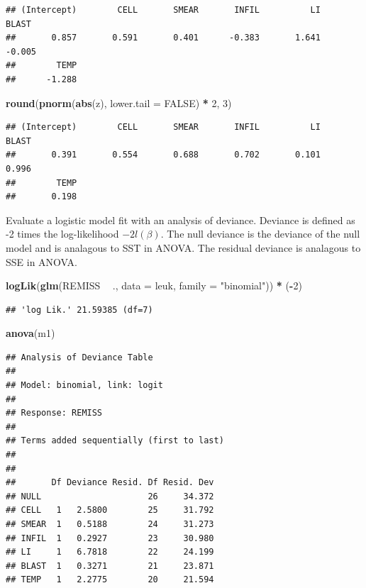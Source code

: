 \documentclass[
]{book}
\newenvironment{Shaded}{\begin{snugshade}}{\end{snugshade}}
\newcommand{\DataTypeTok}[1]{\textcolor[rgb]{0.13,0.29,0.53}{#1}}
\newcommand{\DecValTok}[1]{\textcolor[rgb]{0.00,0.00,0.81}{#1}}
\newcommand{\KeywordTok}[1]{\textcolor[rgb]{0.13,0.29,0.53}{\textbf{#1}}}
\newcommand{\NormalTok}[1]{#1}
\newcommand{\OperatorTok}[1]{\textcolor[rgb]{0.81,0.36,0.00}{\textbf{#1}}}
\newcommand{\OtherTok}[1]{\textcolor[rgb]{0.56,0.35,0.01}{#1}}
\newcommand{\StringTok}[1]{\textcolor[rgb]{0.31,0.60,0.02}{#1}}
\begin{document}
\begin{verbatim}
## (Intercept)        CELL       SMEAR       INFIL          LI       BLAST 
##       0.857       0.591       0.401      -0.383       1.641      -0.005 
##        TEMP 
##      -1.288
\end{verbatim}

\begin{Shaded}
\begin{Highlighting}[]
\KeywordTok{round}\NormalTok{(}\KeywordTok{pnorm}\NormalTok{(}\KeywordTok{abs}\NormalTok{(z), }\DataTypeTok{lower.tail =} \OtherTok{FALSE}\NormalTok{) }\OperatorTok{*}\StringTok{ }\DecValTok{2}\NormalTok{, }\DecValTok{3}\NormalTok{)}
\end{Highlighting}
\end{Shaded}

\begin{verbatim}
## (Intercept)        CELL       SMEAR       INFIL          LI       BLAST 
##       0.391       0.554       0.688       0.702       0.101       0.996 
##        TEMP 
##       0.198
\end{verbatim}

Evaluate a logistic model fit with an analysis of deviance. Deviance is defined as -2 times the log-likelihood \(-2l(\beta)\). The null deviance is the deviance of the null model and is analagous to SST in ANOVA. The residual deviance is analagous to SSE in ANOVA.

\begin{Shaded}
\begin{Highlighting}[]
\KeywordTok{logLik}\NormalTok{(}\KeywordTok{glm}\NormalTok{(REMISS }\OperatorTok{~}\StringTok{ }\NormalTok{., }\DataTypeTok{data =}\NormalTok{ leuk, }\DataTypeTok{family =} \StringTok{"binomial"}\NormalTok{)) }\OperatorTok{*}\StringTok{ }\NormalTok{(}\OperatorTok{-}\DecValTok{2}\NormalTok{)}
\end{Highlighting}
\end{Shaded}

\begin{verbatim}
## 'log Lik.' 21.59385 (df=7)
\end{verbatim}

\begin{Shaded}
\begin{Highlighting}[]
\KeywordTok{anova}\NormalTok{(m1)}
\end{Highlighting}
\end{Shaded}

\begin{verbatim}
## Analysis of Deviance Table
## 
## Model: binomial, link: logit
## 
## Response: REMISS
## 
## Terms added sequentially (first to last)
## 
## 
##       Df Deviance Resid. Df Resid. Dev
## NULL                     26     34.372
## CELL   1   2.5800        25     31.792
## SMEAR  1   0.5188        24     31.273
## INFIL  1   0.2927        23     30.980
## LI     1   6.7818        22     24.199
## BLAST  1   0.3271        21     23.871
## TEMP   1   2.2775        20     21.594
\end{verbatim}
\end{document}

